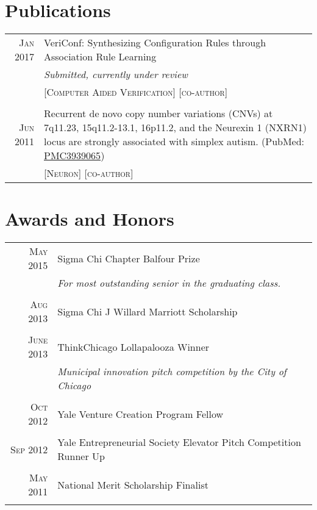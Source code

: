 \documentclass[a4paper,10pt]{article}
\begin{document}
\section{Publications}
\begin{tabular}{rp{11cm}}
 \textsc{Jan} 2017 & VeriConf: Synthesizing Configuration Rules through Association Rule Learning\\
 								& \small\emph{Submitted, currently under review} \\
 							    & \textsc{[Computer Aided Verification]} \textsc{[co-author]} \\
\multicolumn{2}{c}{} \\
 \textsc{Jun} 2011 & Recurrent de novo copy number variations (CNVs) at 7q11.23, 15q11.2-13.1, 16p11.2, and the Neurexin 1 (NXRN1) locus are strongly associated with simplex autism. (PubMed: \href{https://www.ncbi.nlm.nih.gov/pmc/articles/PMC3939065/}{PMC3939065}) \\
 							   & \textsc{[Neuron]} \textsc{[co-author]} 
\end{tabular}

\section{Awards and Honors}
\begin{tabular}{rp{11cm}}
 \textsc{May} 2015 & Sigma Chi Chapter Balfour Prize \\
 							    & \small\emph{For most outstanding senior in the graduating class.} \\
 \multicolumn{2}{c}{} \\
 \textsc{Aug} 2013 & Sigma Chi J Willard Marriott Scholarship \\
 \multicolumn{2}{c}{} \\
 \textsc{June} 2013 & ThinkChicago Lollapalooza Winner \\
 							    & \small\emph{Municipal innovation pitch competition by the City of Chicago} \\
 \multicolumn{2}{c}{} \\
 \textsc{Oct} 2012 & Yale Venture Creation Program Fellow \\
 \multicolumn{2}{c}{} \\	
 \textsc{Sep} 2012 & Yale Entrepreneurial Society Elevator Pitch Competition Runner Up \\
 \multicolumn{2}{c}{} \\
 \textsc{May} 2011 & National Merit Scholarship Finalist \\
 \multicolumn{2}{c}{} \\
\end{tabular}
\end{document}

